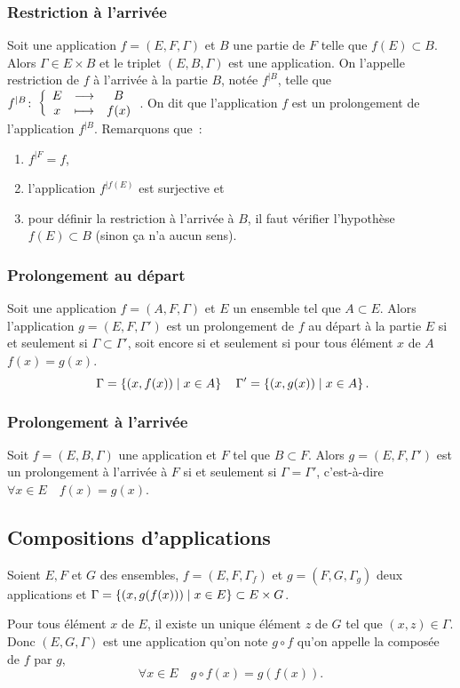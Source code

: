 \subsubsection{Restriction à l'arrivée}
\label{chap3-subsubsec:restrictionarr}
Soit une application \(f=(E,F,\Gamma)\) et \(B\) une partie de \(F\) telle que 
\(f(E) \subset B\). Alors \(\Gamma \in E \times B\) et le triplet 
\((E,B,\Gamma)\) est une application. On l'appelle restriction de \(f\) à 
l'arrivée à la partie \(B\), notée \(f^{|B}\), telle que 
\(f^{|B}\colon \left\{\begin{array}{ccc} E & \longrightarrow &B\\ x & \longmapsto & f(x) \end{array} \right.\). On dit que l'application \(f\) est un 
prolongement de l'application \(f^{|B}\). Remarquons que~:
\begin{enumerate}
    \item \(f^{|F}=f\), 
    \item l'application \(f^{|f(E)}\) est surjective et 
    \item pour définir la restriction à l'arrivée à \(B\), il faut vérifier 
        l'hypothèse \(f(E) \subset B\) (sinon ça n'a aucun sens).
\end{enumerate}

\subsubsection{Prolongement au départ}
\label{chap3-subsubsec:prolongementdep}
Soit une application \(f=(A,F,\Gamma)\) et \(E\) un ensemble tel que \(A \subset 
E\). Alors l'application \(g=(E,F,\Gamma')\) est un prolongement de \(f\) au 
départ à la partie \(E\) si et seulement si \(\Gamma \subset \Gamma'\), soit 
encore si et seulement si pour tous élément \(x\) de \(A\) \(f(x)=g(x)\).
\begin{equation}\
    \Gamma=\left\{(x,f(x))\mathrel{}\middle|\mathrel{}x \in A\right\} \quad \Gamma'=\left\{(x,g(x))\mathrel{}\middle|\mathrel{}x \in A\right\}.
\end{equation}
\subsubsection{Prolongement à l'arrivée}
\label{chap3-subsubsec:prolongementarr}
Soit \(f=(E,B,\Gamma)\) une application et \(F\) tel que \(B \subset F\). Alors 
\(g=(E,F,\Gamma')\) est un prolongement à l'arrivée à \(F\) si et seulement si 
\(\Gamma = \Gamma'\), c'est-à-dire \(\forall x \in E \quad f(x)=g(x)\).
%
\subsection{Compositions d'applications}
\label{chap3-subsec:compapp}
\begin{defdef}
    Soient \(E,F\) et \(G\) des ensembles, \(f=(E,F,\Gamma_f)\) et \(g=(F,G, 
    \Gamma_g)\) deux applications et \(\Gamma = \left\{(x,g(f(x)))\mathrel{}\middle|\mathrel{}x \in E\right\} \subset 
    E \times G\).
\end{defdef}
Pour tous élément \(x\) de \(E\), il existe un unique élément \(z\) de \(G\) tel 
que \((x,z) \in \Gamma\). Donc \((E,G,\Gamma)\) est une application qu'on note 
\(g \circ f\) qu'on appelle la composée de \(f\) par \(g\),
\begin{equation}
    \forall x \in E \quad g \circ f(x)=g(f(x)).
\end{equation}

